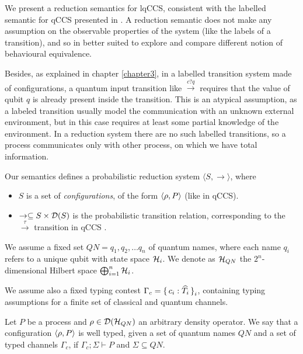 We present a reduction semantics for lqCCS, consistent with the labelled semantic for qCCS presented in \cite{fengBisimulationQuantumProcesses2012, dengOpenBisimulationQuantum2012}. A reduction semantic does not make any assumption on the observable properties of the system (like the labels of a transition), and so in better suited to explore and compare different notion of behavioural equivalence.

Besides, as explained in chapter \ref{chapter3}, in a labelled transition system made of configurations, a quantum input transition like $\xrightarrow{c?q}$ requires that the value of qubit $q$ is already present inside the transition. This is an atypical assumption, as a labeled transition usually model the communication with an unknown external environment, but in this case requires at least some partial knowledge of the environment. In a reduction system there are no such labelled transitions, so a process communicates only with other process, on which we have total information.

Our semantics defines a probabilistic reduction system $\langle S, \rightarrow \rangle$, where \begin{itemize}
\item $S$ is a set of \textit{configurations}, of the form $\langle\rho, P\rangle$ (like in qCCS).
\item $\rightarrow \subseteq S \times \mathcal{D}(S)$ is the probabilistic transition relation, corresponding to the $\xrightarrow{\tau}$ transition in qCCS \cite{fengBisimulationQuantumProcesses2012, dengOpenBisimulationQuantum2012}.
\end{itemize}

We assume a fixed set  $QN = {q_1, q_2, \ldots q_n}$ of quantum names, where each name $q_i$ refers to a unique qubit with state space $\mathcal{H}_i$. We denote as $\mathcal{H}_{QN}$ the $2^n$-dimensional Hilbert space $\bigoplus_{i=1}^n \mathcal{H}_i$.

We assume also a fixed typing contest $\Gamma_c = \set{c_i: \widehat{T_i}}_i$, containing typing assumptions for a finite set of classical and quantum channels.

\begin{definition}
Let $P$ be a process and $\rho \in \mathcal{D}(\mathcal{H}_{QN})$ an arbitrary density operator. We say that a configuration $\langle\rho, P\rangle$ is well typed, given a set of quantum names $QN$ and a set of typed channels $\Gamma_c$, if $\Gamma_c; \Sigma \vdash P$ and $\Sigma \subseteq QN$.

\end{definition}

